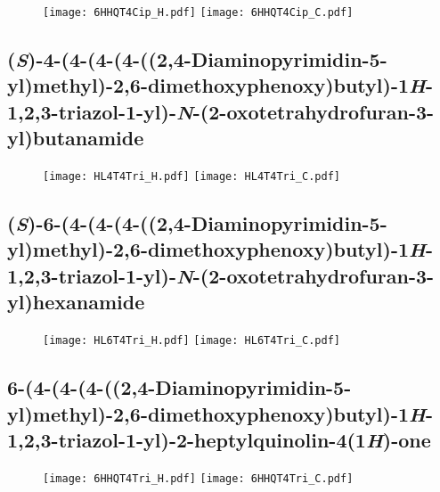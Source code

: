 \begin{figure}[H]
	\centering
		\texttt{[image: 6HHQT4Cip\_H.pdf]}
		\texttt{[image: 6HHQT4Cip\_C.pdf]}
\end{figure}

\subsection{(\textit{S})-4-(4-(4-(4-((2,4-Diaminopyrimidin-5-yl)methyl)-2,6-dimethoxyphenoxy)butyl)-1\textit{H}-1,2,3-triazol-1-yl)-\textit{N}-(2-oxotetrahydrofuran-3-yl)butanamide }

\begin{figure}[H]
	\centering
		\texttt{[image: HL4T4Tri\_H.pdf]}
		\texttt{[image: HL4T4Tri\_C.pdf]}
\end{figure}

\subsection{(\textit{S})-6-(4-(4-(4-((2,4-Diaminopyrimidin-5-yl)methyl)-2,6-dimethoxyphenoxy)butyl)-1\textit{H}-1,2,3-triazol-1-yl)-\textit{N}-(2-oxotetrahydrofuran-3-yl)hexanamide }

\begin{figure}[H]
	\centering
		\texttt{[image: HL6T4Tri\_H.pdf]}
		\texttt{[image: HL6T4Tri\_C.pdf]}
\end{figure}

\subsection{6-(4-(4-(4-((2,4-Diaminopyrimidin-5-yl)methyl)-2,6-dimethoxyphenoxy)butyl)-1\textit{H}-1,2,3-triazol-1-yl)-2-heptylquinolin-4(1\textit{H})-one }

\begin{figure}[H]
	\centering
		\texttt{[image: 6HHQT4Tri\_H.pdf]}
		\texttt{[image: 6HHQT4Tri\_C.pdf]}
\end{figure}

